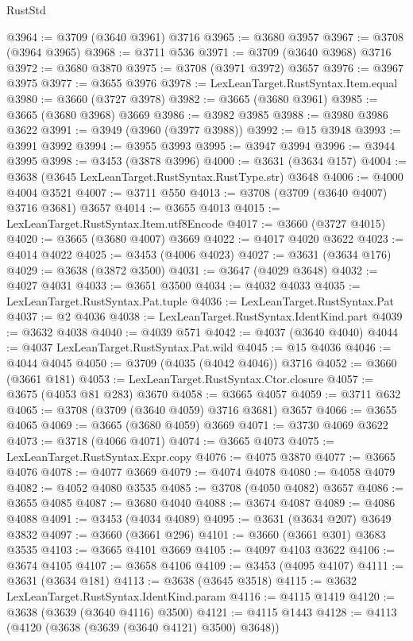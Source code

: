 \begin{lexlean}{RustStd}
\begin{coremodule}
@3964 := @3709 (@3640 @3961) @3716
@3965 := @3680 @3957
@3967 := @3708 (@3964 @3965)
@3968 := @3711 @536
@3971 := @3709 (@3640 @3968) @3716
@3972 := @3680 @3870
@3975 := @3708 (@3971 @3972) @3657
@3976 := @3967 @3975
@3977 := @3655 @3976
@3978 := LexLeanTarget.RustSyntax.Item.equal
@3980 := @3660 (@3727 @3978)
@3982 := @3665 (@3680 @3961)
@3985 := @3665 (@3680 @3968) @3669
@3986 := @3982 @3985
@3988 := @3980 @3986 @3622
@3991 := @3949 (@3960 (@3977 @3988))
@3992 := @15 @3948
@3993 := @3991 @3992
@3994 := @3955 @3993
@3995 := @3947 @3994
@3996 := @3944 @3995
@3998 := @3453 (@3878 @3996)
@4000 := @3631 (@3634 @157)
@4004 := @3638 (@3645 LexLeanTarget.RustSyntax.RustType.str) @3648
@4006 := @4000 @4004 @3521
@4007 := @3711 @550
@4013 := @3708 (@3709 (@3640 @4007) @3716 @3681) @3657
@4014 := @3655 @4013
@4015 := LexLeanTarget.RustSyntax.Item.utf8Encode
@4017 := @3660 (@3727 @4015)
@4020 := @3665 (@3680 @4007) @3669
@4022 := @4017 @4020 @3622
@4023 := @4014 @4022
@4025 := @3453 (@4006 @4023)
@4027 := @3631 (@3634 @176)
@4029 := @3638 (@3872 @3500)
@4031 := @3647 (@4029 @3648)
@4032 := @4027 @4031
@4033 := @3651 @3500
@4034 := @4032 @4033
@4035 := LexLeanTarget.RustSyntax.Pat.tuple
@4036 := LexLeanTarget.RustSyntax.Pat
@4037 := @2 @4036
@4038 := LexLeanTarget.RustSyntax.IdentKind.part
@4039 := @3632 @4038
@4040 := @4039 @571
@4042 := @4037 (@3640 @4040)
@4044 := @4037 LexLeanTarget.RustSyntax.Pat.wild
@4045 := @15 @4036
@4046 := @4044 @4045
@4050 := @3709 (@4035 (@4042 @4046)) @3716
@4052 := @3660 (@3661 @181)
@4053 := LexLeanTarget.RustSyntax.Ctor.closure
@4057 := @3675 (@4053 @81 @283) @3670
@4058 := @3665 @4057
@4059 := @3711 @632
@4065 := @3708 (@3709 (@3640 @4059) @3716 @3681) @3657
@4066 := @3655 @4065
@4069 := @3665 (@3680 @4059) @3669
@4071 := @3730 @4069 @3622
@4073 := @3718 (@4066 @4071)
@4074 := @3665 @4073
@4075 := LexLeanTarget.RustSyntax.Expr.copy
@4076 := @4075 @3870
@4077 := @3665 @4076
@4078 := @4077 @3669
@4079 := @4074 @4078
@4080 := @4058 @4079
@4082 := @4052 @4080 @3535
@4085 := @3708 (@4050 @4082) @3657
@4086 := @3655 @4085
@4087 := @3680 @4040
@4088 := @3674 @4087
@4089 := @4086 @4088
@4091 := @3453 (@4034 @4089)
@4095 := @3631 (@3634 @207) @3649 @3832
@4097 := @3660 (@3661 @296)
@4101 := @3660 (@3661 @301) @3683 @3535
@4103 := @3665 @4101 @3669
@4105 := @4097 @4103 @3622
@4106 := @3674 @4105
@4107 := @3658 @4106
@4109 := @3453 (@4095 @4107)
@4111 := @3631 (@3634 @181)
@4113 := @3638 (@3645 @3518)
@4115 := @3632 LexLeanTarget.RustSyntax.IdentKind.param
@4116 := @4115 @1419
@4120 := @3638 (@3639 (@3640 @4116) @3500)
@4121 := @4115 @1443
@4128 := @4113 (@4120 (@3638 (@3639 (@3640 @4121) @3500) @3648))

\end{coremodule}
\end{lexlean}
